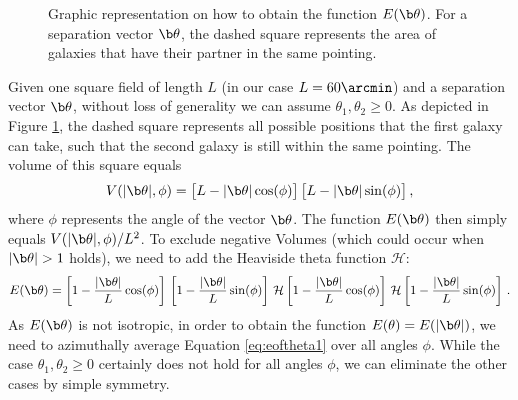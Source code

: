 {
\def\vec{\b}
\begin{SCfigure}
    \centering
    \def\svgwidth{200pt}    
    \hspace*{1cm}
      
    \hspace*{-2cm}
    \caption[Graphic how to obtain $E(\b\theta)$]{Graphic representation on how to obtain the function $E(\b\theta)$. For a separation vector $\b\theta$, the dashed square represents the area of galaxies that have their partner in the same pointing.}
    \label{fig:explain_etheta}
\end{SCfigure}
}
Given one square field of length $L$ (in our case $L=60\arcmin$) and a separation vector $\b\theta$, without loss of generality we can assume $\theta_1,\theta_2\geq 0$. As depicted in Figure \ref{fig:explain_etheta}, the dashed square represents all possible positions that the first galaxy can take, such that the second galaxy is still within the same pointing. The volume of this square equals \begin{equation}
V(|\b\theta|,\phi)  = \big[L-|\b\theta|\cos(\phi)\big]\,\big[L-|\b\theta|\sin(\phi)\big]\, ,
\end{equation} where $\phi$ represents the angle of the vector $\b\theta$. The function $E(\b\theta)$ then simply equals $V(|\b\theta|,\phi)/L^2$. To exclude negative Volumes (which could occur when $|\b\theta|>1$ holds), we need to add the Heaviside theta function $\mathcal{H}$:
\begin{equation}
E(\b\theta)  = \left[1-\frac{|\b\theta|}{L}\cos(\phi)\right]\,\left[1-\frac{|\b\theta|}{L}\sin(\phi)\right]\, \mathcal{H}\left[1-\frac{|\b\theta|}{L}\cos(\phi)\right]\,\mathcal{H}\left[1-\frac{|\b\theta|}{L}\sin(\phi)\right]\, .
\label{eq:eoftheta1}
\end{equation} 
As $E(\b\theta)$ is not isotropic, in order to obtain the function $E(\theta) = E(|\b\theta|)$, we need to azimuthally average Equation \eqref{eq:eoftheta1} over all angles $\phi$. While the case $\theta_1,\theta_2\geq 0$ certainly does not hold for all angles $\phi$, we can eliminate the other cases by simple symmetry.
